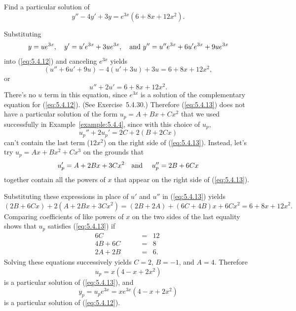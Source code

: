 \setcounter{example}{4}
\setcounter{equation}{11}
\begin{example}
  \label{example:5.4.5} \rm Find a particular solution of
  \begin{equation}
    \label{eq:5.4.12}y''-4y'+3y=e^{3x}(6+8x+12x^{2}).
  \end{equation}
\end{example}
\setcounter{equation}{12}
\begin{examplesolution}
\solution Substituting
\[
  y=ue^{3x},\quad y'=u'e^{3x}+3ue^{3x},\mbox{\quad and }y''=u''e^{3x}+6u'e^{3x}+9ue^{3x}
\]
into (\ref{eq:5.4.12}) and canceling $e^{3x}$ yields
\[
  (u''+6u'+9u)-4(u'+3u)+3u=6+8x+12x^{2},
\]
or
\begin{equation}
  \label{eq:5.4.13}u''+2u'=6+8x+12x^{2}.
\end{equation}
There's no $u$ term in this equation, since $e^{3x}$ is a solution of the complementary equation for
(\ref{eq:5.4.12}). (See Exercise~5.4.30.) Therefore (\ref{eq:5.4.13}) does not have a
particular solution of the form $u_{p}=A+Bx+Cx^{2}$ that we used successfully in
Example~\ref{example:5.4.4}, since with this choice of $u_{p}$,
\[
  u_{p}''+2u_{p}'=2C+2(B+2Cx)
\]
can't contain the last term ($12x^{2}$) on the right side of (\ref{eq:5.4.13}). Instead, let's try
$u_{p}=Ax+Bx^{2}+Cx^{3}$ on the grounds that
\[
  u_{p}'=A+2Bx+3Cx^{2}\mbox{\quad and \quad}u_{p}''=2B+6Cx
\]
together contain all the powers of $x$ that appear on the right side of (\ref{eq:5.4.13}).

Substituting these expressions in place of $u'$ and $u''$ in (\ref{eq:5.4.13}) yields
\[
  (2B+6Cx)+2(A+2Bx+3Cx^{2})=(2B+2A)+(6C+4B)x+6Cx^{2}=6+8x+12x^{2}.
\]
Comparing coefficients of like powers of $x$ on the two sides of the last equality shows that
$u_{p}$ satisfies (\ref{eq:5.4.13}) if
\[
  \begin{array}{rcr}
    6C                     & = & 12\phantom{.} \\
    4B+6C                  & = & 8\phantom{.}  \\
    2A+2B\phantom{+6u_{2}} & = & 6.
  \end{array}
\]
Solving these equations successively yields $C=2$, $B=-1$, and $A=4$. Therefore
\[
  u_{p}=x(4-x+2x^{2})
\]
is a particular solution of (\ref{eq:5.4.13}), and
\[
  y_{p}=u_{p}e^{3x}=xe^{3x}(4-x+2x^{2})
\]
is a particular solution of (\ref{eq:5.4.12}).
\end{examplesolution}

